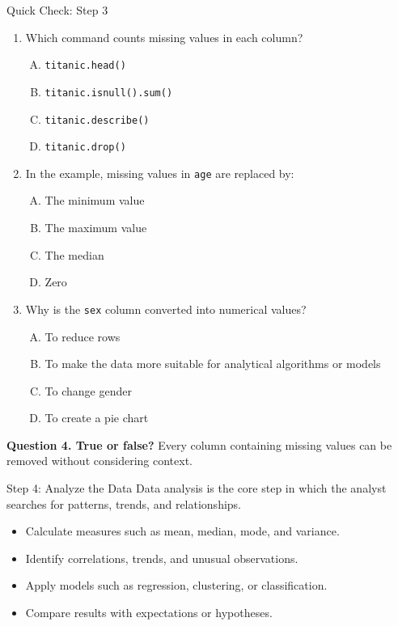 \documentclass[aspectratio=169,11pt]{beamer}
\newcommand{\quiztitle}[1]{\textbf{\textcolor{QuizOrange}{#1}}}
\begin{document}
\begin{frame}{Quick Check: Step 3}
\begin{enumerate}\small
  \item Which command counts missing values in each column?
  \begin{enumerate}[A.]\small
    \item \texttt{titanic.head()} \item \texttt{titanic.isnull().sum()} \item \texttt{titanic.describe()} \item \texttt{titanic.drop()}
  \end{enumerate}
  \item In the example, missing values in \texttt{age} are replaced by:
  \begin{enumerate}[A.]\small
    \item The minimum value \item The maximum value \item The median \item Zero
  \end{enumerate}
  \item Why is the \texttt{sex} column converted into numerical values?
  \begin{enumerate}[A.]\small
    \item To reduce rows \item To make the data more suitable for analytical algorithms or models \item To change gender \item To create a pie chart
  \end{enumerate}
\end{enumerate}
\quiztitle{Question 4. True or false?} Every column containing missing values can be removed without considering context.
\end{frame}

\begin{frame}{Step 4: Analyze the Data}
Data analysis is the core step in which the analyst searches for patterns, trends, and relationships.
\begin{itemize}
  \item Calculate measures such as mean, median, mode, and variance.
  \item Identify correlations, trends, and unusual observations.
  \item Apply models such as regression, clustering, or classification.
  \item Compare results with expectations or hypotheses.
\end{itemize}
\end{frame}
\end{document}
